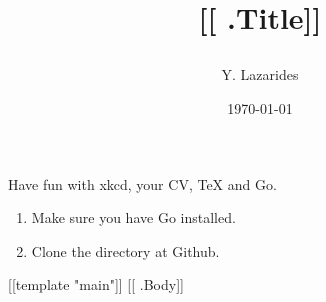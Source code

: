 \documentclass[a4paper, oneside, 
               justified=true, sfsidenotes]{article}
\date{\today}
\begin{document}
\title{[[ .Title]] \author{Y. Lazarides}}
\maketitle
Have fun with xkcd, your CV, TeX and Go.

\begin{enumerate}
\item Make sure you have Go installed.
\item Clone the directory at Github.
\end{enumerate}
[[template "main"]]
[[ .Body]]
\lipsum[1-10]
\end{document}
